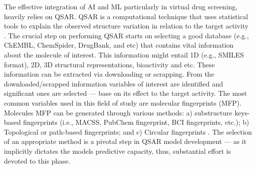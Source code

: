 The effective integration of AI and ML particularly in virtual drug screening, heavily relies on QSAR. QSAR is a computational technique that uses statistical tools to explain the observed structure variation in relation to the target activity \cite{ammad2014integrative}. The crucial step on performing QSAR starts on selecting a good database (e.g., ChEMBL, ChemSpider, DrugBank, and etc) that contains vital information about the molecule of interest. This information might entail 1D (e.g., SMILES format), 2D, 3D structural representations, bioactivity and etc. These information can be extracted via downloading or scrapping. From the downloaded/scrapped information variables of interest are identified and significant ones are selected --- base on its effect to the target activity. The most common variables used in this field of study are molecular fingerprints (MFP). Molecules MFP can be generated through various methods: a) substructure keys-based fingerprints (i.e., MACSS, PubChem fingerprint, BCI fingerprints, etc.); b) Topological or path-based fingerprints; and c) Circular fingerprints \cite{cereto2015MF}. The selection of an appropriate method is a pivotal step in QSAR model development --- as it implicitly dictates the models predictive capacity, thus, substantial effort is devoted to this phase. 

